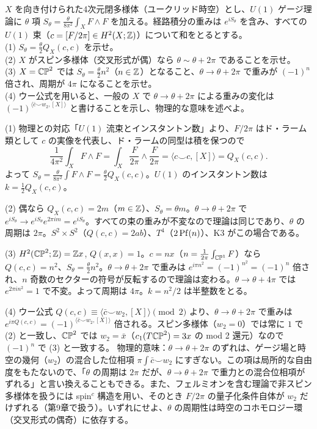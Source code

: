 \begin{problem}[難易度 C]\label{ch06-prob-theta}
$X$ を向き付けられた4次元閉多様体（ユークリッド時空）とし、$U(1)$ ゲージ理論に $\theta$ 項 $S_\theta=\frac{\theta}{8\pi^2}\int_XF\wedge F$ を加える。経路積分の重みは $e^{iS_\theta}$ を含み、すべての $U(1)$ 束（$c=[F/2\pi]\in H^2(X;\mathbb{Z})$）について和をとるとする。\\
(1) $S_\theta=\frac\theta2Q_X(c,c)$ を示せ。\\
(2) $X$ がスピン多様体（交叉形式が偶）なら $\theta\sim\theta+2\pi$ であることを示せ。\\
(3) $X=\mathbb{CP}^2$ では $S_\theta=\frac\theta2n^2$（$n\in\mathbb{Z}$）となること、$\theta\to\theta+2\pi$ で重みが $(-1)^n$ 倍され、周期が $4\pi$ になることを示せ。\\
(4) ウー公式を用いると、一般の $X$ で $\theta\to\theta+2\pi$ による重みの変化は $(-1)^{\langle\bar c\smile w_2,[X]\rangle}$ と書けることを示し、物理的な意味を述べよ。
\end{problem}

\begin{solution}
(1) 物理との対応「$U(1)$ 流束とインスタントン数」より、$F/2\pi$ はド・ラーム類として $c$ の実像を代表し、ド・ラームの同型は積を保つので
\[
\frac{1}{4\pi^2}\int_XF\wedge F=\int_X\frac F{2\pi}\wedge\frac F{2\pi}=\langle c\smile c,[X]\rangle=Q_X(c,c).
\]
よって $S_\theta=\frac{\theta}{8\pi^2}\int F\wedge F=\frac\theta2Q_X(c,c)$。$U(1)$ のインスタントン数は $k=\frac12Q_X(c,c)$。

(2) 偶なら $Q_X(c,c)=2m$（$m\in\mathbb{Z}$）、$S_\theta=\theta m$。$\theta\to\theta+2\pi$ で $e^{iS_\theta}\to e^{iS_\theta}e^{2\pi im}=e^{iS_\theta}$。すべての束の重みが不変なので理論は同じであり、$\theta$ の周期は $2\pi$。$S^2\times S^2$（$Q(c,c)=2ab$）、$T^4$（$2\operatorname{Pf}(n)$）、K3 がこの場合である。

(3) $H^2(\mathbb{CP}^2;\mathbb{Z})=\mathbb{Z} x$, $Q(x,x)=1$。$c=nx$（$n=\frac1{2\pi}\int_{\mathbb{CP}^1}F$）なら $Q(c,c)=n^2$、$S_\theta=\frac\theta2n^2$。$\theta\to\theta+2\pi$ で重みは $e^{i\pi n^2}=(-1)^{n^2}=(-1)^n$ 倍され、$n$ 奇数のセクターの符号が反転するので理論は変わる。$\theta\to\theta+4\pi$ では $e^{2\pi in^2}=1$ で不変。よって周期は $4\pi$。$k=n^2/2$ は半整数をとる。

(4) ウー公式 $Q(c,c)\equiv\langle\bar c\smile w_2,[X]\rangle\pmod2$ より、$\theta\to\theta+2\pi$ で重みは $e^{i\pi Q(c,c)}=(-1)^{\langle\bar c\smile w_2,[X]\rangle}$ 倍される。スピン多様体（$w_2=0$）では常に $1$ で (2) と一致し、$\mathbb{CP}^2$ では $w_2=\bar x$（$c_1(T\mathbb{CP}^2)=3x$ の mod 2 還元）なので $(-1)^n$ で (3) と一致する。
物理的意味：$\theta\to\theta+2\pi$ のずれは、ゲージ場と時空の幾何（$w_2$）の混合した位相項 $\pi\int\bar c\smile w_2$ にすぎない。この項は局所的な自由度をもたないので、「$\theta$ の周期は $2\pi$ だが、$\theta\to\theta+2\pi$ で重力との混合位相項がずれる」と言い換えることもできる。また、フェルミオンを含む理論で非スピン多様体を扱うには spin$^c$ 構造を用い、そのとき $F/2\pi$ の量子化条件自体が $w_2$ だけずれる（第9章で扱う）。いずれにせよ、$\theta$ の周期性は時空のコホモロジー環（交叉形式の偶奇）に依存する。
\end{solution}

